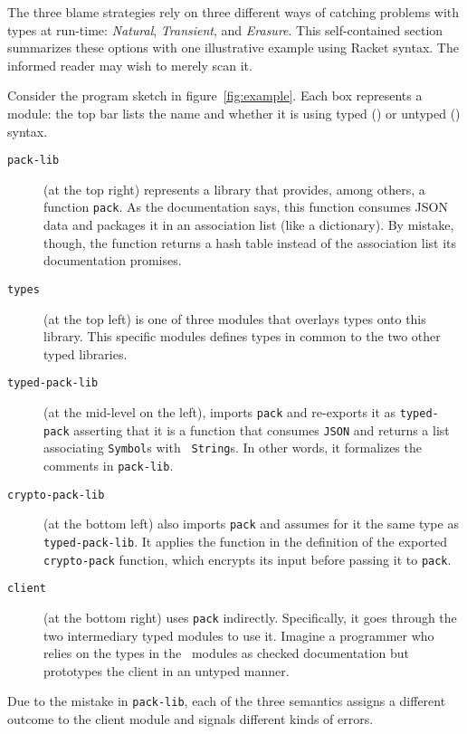 
The three blame strategies rely on three different ways of catching problems
with types at run-time: {\em Natural\/}, {\em Transient\/}, and {\em
Erasure\/}. This self-contained section summarizes these options with one illustrative example
using Racket syntax. The informed reader may wish to merely scan it.

Consider the program sketch in figure~\ref{fig:example}. Each box represents a
module: the top bar lists the name and whether it is using typed (\typecolor) or
untyped (\dyncolor) syntax.
\begin{description}

\item[\texttt{pack-lib}] (at the top right) represents a library that provides,
among others, a function {\tt pack}. As the documentation says, this function
consumes JSON data and packages it in an association list (like a dictionary). By mistake, though, the
function returns a hash table instead of the association list its documentation
promises.

\item[\texttt{types}] (at the top left) is one of three modules that overlays
types onto this library. This specific modules defines types in common to the
two other typed libraries. 

\item[\texttt{typed-pack-lib}] (at the mid-level on the left), imports {\tt pack}
and re-exports it as \texttt{typed-pack} asserting that it is a function that
consumes {\tt JSON} and returns a list associating {\tt Symbol}s with {\tt
String}s. In other words, it formalizes the comments in {\tt pack-lib}.

\item[\texttt{crypto-pack-lib}] (at the bottom left) also imports \texttt{pack}
and assumes for it the same type as {\tt typed-pack-lib}. It applies the
function in the definition of the exported {\tt crypto-pack} function, which
encrypts its input before passing it to \texttt{pack}.

\item[\texttt{client}] (at the bottom right) uses {\tt pack}
indirectly. Specifically, it goes through the two intermediary typed modules to
use it. Imagine a programmer who relies on the types in the \typecolor\
modules as checked documentation but prototypes the client in an untyped manner.

\end{description}
Due to the mistake in {\tt pack-lib}, each of the three semantics assigns a
different outcome to the client module and signals different kinds of errors.

